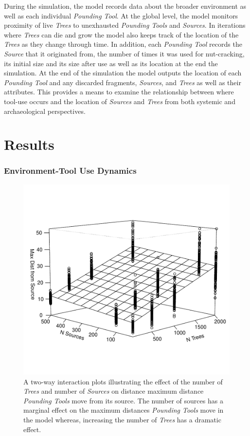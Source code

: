 \documentclass[9pt,twocolumn,twoside,]{pnas-new}
\begin{document}
During the simulation, the model records data about the broader
environment as well as each individual \emph{Pounding Tool}. At the
global level, the model monitors proximity of live \emph{Trees} to
unexhausted \emph{Pounding Tools} and \emph{Sources}. In iterations
where \emph{Trees} can die and grow the model also keeps track of the
location of the \emph{Trees} as they change through time. In addition,
each \emph{Pounding Tool} records the \emph{Source} that it originated
from, the number of times it was used for nut-cracking, its initial size
and its size after use as well as its location at the end the
simulation. At the end of the simulation the model outputs the location
of each \emph{Pounding Tool} and any discarded fragments,
\emph{Sources}, and \emph{Trees} as well as their attributes. This
provides a means to examine the relationship between where tool-use
occurs and the location of \emph{Sources} and \emph{Trees} from both
systemic and archaeological perspectives.

\hypertarget{results}{%
\section{Results}\label{results}}

\hypertarget{environment-tool-use-dynamics}{%
\subsubsection{Environment-Tool Use
Dynamics}\label{environment-tool-use-dynamics}}

\begin{figure}
\centering
\includegraphics{Reeves_et_al_2021_Panda_ABM_files/figure-latex/figure 1-1.pdf}
\caption{A two-way interaction plots illustrating the effect of the
number of \emph{Trees} and number of \emph{Sources} on distance maximum
distance \emph{Pounding Tools} move from its source. The number of
sources has a marginal effect on the maximum distances \emph{Pounding
Tools} move in the model whereas, increasing the number of \emph{Trees}
has a dramatic effect. \label{d2source}}
\end{figure}
\end{document}
